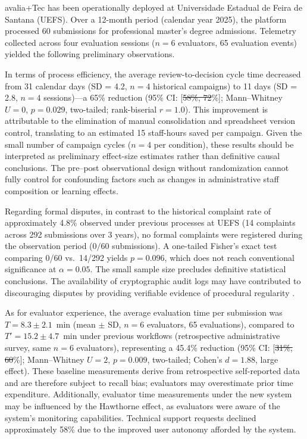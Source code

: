 \documentclass[preprint,12pt,a4paper]{elsarticle}
\makeatletter
\providecommand{\DIFaddtex}[1]{{\protect\color{blue}\uwave{#1}}} %
\providecommand{\DIFdeltex}[1]{{\protect\color{red}\sout{#1}}} %
\providecommand{\DIFaddbegin}{} %
\providecommand{\DIFaddend}{} %
\providecommand{\DIFdelbegin}{} %
\providecommand{\DIFdelend}{} %
\providecommand{\DIFadd}[1]{\texorpdfstring{\DIFaddtex{#1}}{#1}} %
\providecommand{\DIFdel}[1]{\texorpdfstring{\DIFdeltex{#1}}{}} %
\providecommand{\DIFscaledelfig}{0.5}
\newlength{\DIFdelgraphicswidth} %
\newlength{\DIFdelgraphicsheight} %
\providecommand{\DIFaddincludegraphics}[2][]{{\color{blue}\fbox{\DIFOincludegraphics[#1]{#2}}}} %
\providecommand{\DIFdelincludegraphics}[2][]{%
\sbox{\DIFdelgraphicsbox}{\DIFOincludegraphics[#1]{#2}}%
\settoboxwidth{\DIFdelgraphicswidth}{\DIFdelgraphicsbox} %
\settoboxtotalheight{\DIFdelgraphicsheight}{\DIFdelgraphicsbox} %
\scalebox{\DIFscaledelfig}{%
\parbox[b]{\DIFdelgraphicswidth}{\usebox{\DIFdelgraphicsbox}\\[-\baselineskip] \rule{\DIFdelgraphicswidth}{0em}}\llap{\resizebox{\DIFdelgraphicswidth}{\DIFdelgraphicsheight}{%
\setlength{\unitlength}{\DIFdelgraphicswidth}%
\begin{picture}(1,1)%
\thicklines\linethickness{2pt} %
{\color[rgb]{1,0,0}\put(0,0){\framebox(1,1){}}}%
{\color[rgb]{1,0,0}\put(0,0){\line( 1,1){1}}}%
{\color[rgb]{1,0,0}\put(0,1){\line(1,-1){1}}}%
\end{picture}%
}\hspace*{3pt}}} %
} %
\DeclareRobustCommand{\DIFaddbegin}{\DIFOaddbegin \let\includegraphics\DIFaddincludegraphics} %
\DeclareRobustCommand{\DIFaddend}{\DIFOaddend \let\includegraphics\DIFOincludegraphics} %
\DeclareRobustCommand{\DIFdelbegin}{\DIFOdelbegin \let\includegraphics\DIFdelincludegraphics} %
\DeclareRobustCommand{\DIFdelend}{\DIFOaddend \let\includegraphics\DIFOincludegraphics} %
\let\sout@orig\sout %
\renewcommand{\sout}[1]{\ifmmode\text{\sout@orig{\ensuremath{#1}}}\else\sout@orig{#1}\fi} %
\makeatother
\begin{document}
avalia+Tec has been operationally deployed at Universidade Estadual de Feira de Santana (UEFS). Over a 12-month period (calendar year 2025), the platform processed 60 submissions for professional master's degree admissions. Telemetry collected across four evaluation sessions ($n = 6$ evaluators, 65 evaluation events) yielded the following preliminary observations.

In terms of process efficiency, the average review-to-decision cycle time decreased from 31 calendar days (SD = 4.2, $n = 4$ historical campaigns) to 11 days (SD = 2.8, $n = 4$ sessions)---a 65\% reduction (95\% CI: [\DIFdelbegin \DIFdel{58\%, 72}\DIFdelend \DIFaddbegin \DIFadd{55\%, 73}\DIFaddend \%]; Mann--Whitney $U = 0$, $p = 0.029$, two-tailed; rank-biserial $r = 1.0$). This improvement is attributable to the elimination of manual consolidation and spreadsheet version control, translating to an estimated 15 staff-hours saved per campaign. Given the small number of campaign cycles ($n = 4$ per condition), these results should be interpreted as preliminary effect-size estimates rather than definitive causal conclusions. The pre--post observational design without randomization cannot fully control for confounding factors such as changes in administrative staff composition or learning effects.

Regarding formal disputes, in contrast to the historical complaint rate of approximately 4.8\% observed under previous processes at UEFS (14 complaints across 292 submissions over 3 years), no formal complaints were registered during the observation period ($0/60$ submissions). A one-tailed Fisher's exact test comparing 0/60 vs.\ 14/292 yields \DIFdelbegin \DIFdel{$p = 0.096$}\DIFdelend \DIFaddbegin \DIFadd{$p = 0.069$}\DIFaddend , which does not reach conventional significance at $\alpha = 0.05$. The small sample size precludes definitive statistical conclusions. The availability of cryptographic audit logs may have contributed to discouraging disputes by providing verifiable evidence of procedural regularity \citep{Hood2007}.

As for evaluator experience, the average evaluation time per submission was $T = 8.3 \pm 2.1$~min (mean $\pm$ SD, $n = 6$ evaluators, 65 evaluations), compared to $T' = 15.2 \pm 4.7$~min under previous workflows (retrospective administrative survey, same $n = 6$ evaluators), representing a 45.4\% reduction (95\% CI: [\DIFdelbegin \DIFdel{31\%, 60}\DIFdelend \DIFaddbegin \DIFadd{26\%, 59}\DIFaddend \%]; Mann--Whitney $U = 2$, $p = 0.009$, two-tailed; Cohen's $d = 1.88$, large effect). These baseline measurements derive from retrospective self-reported data and are therefore subject to recall bias; evaluators may overestimate prior time expenditure. Additionally, evaluator time measurements under the new system may be influenced by the Hawthorne effect, as evaluators were aware of the system's monitoring capabilities. Technical support requests declined approximately 58\% due to the improved user autonomy afforded by the system.
\end{document}
